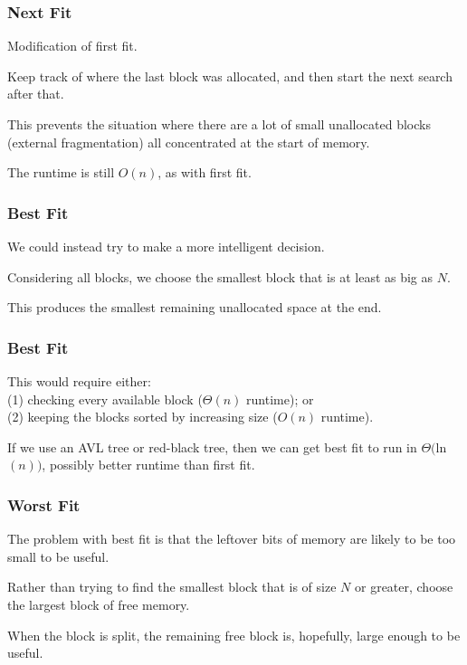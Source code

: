 \begin{frame}
\frametitle{Next Fit}

Modification of first fit.

Keep track of where the last block was allocated, and then start the next search after that. 

This prevents the situation where there are a lot of small unallocated blocks (external fragmentation) all concentrated at the start of memory. 

The runtime is still $O(n)$, as with first fit.

\end{frame}



\begin{frame}
\frametitle{Best Fit}

We could instead try to make a more intelligent decision. 

Considering all blocks, we choose the smallest block that is at least as big as $N$.

This produces the smallest remaining unallocated space at the end. 

\end{frame}

\begin{frame}
\frametitle{Best Fit}

This would require either:\\
\quad (1) checking every available block ($\Theta(n)$ runtime); or\\
\quad (2) keeping the blocks sorted by increasing size ($O(n)$ runtime). 

If we use an AVL tree or red-black tree, then we can get best fit to run in $\Theta($ln$(n))$, possibly better runtime than first fit.

\end{frame}

\begin{frame}
\frametitle{Worst Fit}

The problem with best fit is that the leftover bits of memory are likely to be too small to be useful. 

Rather than trying to find the smallest block that is of size $N$ or greater, choose the largest block of free memory. 

When the block is split, the remaining free block is, hopefully, large enough to be useful. 



\end{frame}

